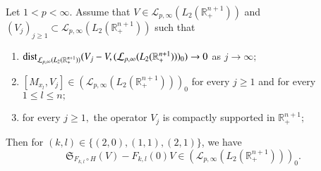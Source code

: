 \documentclass{amsart}
\begin{document}
\begin{lemma}\label{criterion lemma}
Let $1<p<\infty$. Assume that $V\in \mathcal{L}_{p,\infty}(L_2(\mathbb{R}^{n+1}_+))$ and $(V_j)_{j\geq1}\subset \mathcal{L}_{p,\infty}(L_2(\mathbb{R}^{n+1}_+))$ such that
\begin{enumerate}[{\rm (i)}]
\item\label{cla} ${\rm dist}_{\mathcal{L}_{p,\infty}(L_2(\mathbb{R}^{n+1}_+))}(V_j-V,(\mathcal{L}_{p,\infty}(L_2(\mathbb{R}^{n+1}_+)))_0)\to 0$ as $j\to\infty;$
\item\label{clb} $[M_{x_l},V_j]\in (\mathcal{L}_{p,\infty}(L_2(\mathbb{R}^{n+1}_+)))_0$ for every $j\geq1$ and for every $1\leq l\leq n;$
\item\label{clc} for every $j\geq 1,$ the operator $V_j$ is compactly supported in $\mathbb{R}^{n+1}_+;$
\end{enumerate}	
Then for $(k,l)\in \{(2,0),(1,1),(2,1)\}$, we have
$$\mathfrak{S}_{F_{k,l}\circ H}(V)-F_{k,l}(0)V\in(\mathcal{L}_{p,\infty}(L_2(\mathbb{R}^{n+1}_+)))_0.$$
\end{lemma}
\end{document}
